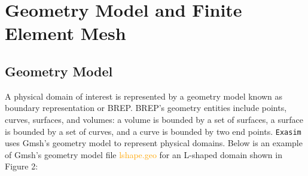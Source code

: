 \documentclass[11pt]{article}
\begin{document}
\section{Geometry Model and Finite Element Mesh}

\subsection{Geometry Model}

A physical domain of interest is represented by a geometry model known as boundary representation or BREP.  BREP's geometry entities include points,  curves, surfaces, and volumes:  a volume is bounded by a set of surfaces, a surface is bounded by a set of curves, and a curve is bounded by two end points. \texttt{Exasim} uses Gmsh's geometry model to represent physical domains. Below is an example of Gmsh's geometry model file \textcolor{orange}{lshape.geo} for an L-shaped domain shown in Figure 2:
\end{document}
